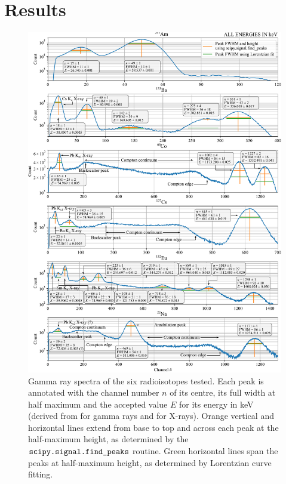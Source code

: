 \documentclass[twocol]{ametsocV6.1}
\begin{document}
\section{Results} \label{sec:results}
\begin{figure}[p]
	\vspace{-0.8cm}
	\centerline{\includegraphics[width=\textwidth]{../figures/all_spectra_annotated.pdf}}
	\cprotect\caption{%
		Gamma ray spectra of the six radioisotopes tested.
		Each peak is annotated with the channel number $n$ of its centre,
		its full width at half maximum and the accepted value $E$ for its
		energy in keV (derived from \cite{heath} for gamma rays and
		\cite{shirley_1978} for X-rays).
		Orange vertical and horizontal lines extend from base to top and
		across each peak at the half-maximum height, as determined by the
		$\verb|scipy.signal.find_peaks|$ routine. Green horizontal lines
		span the peaks at half-maximum height, as determined by Lorentzian
		curve fitting.
	} 
	\label{fig:spectra}
\end{figure}
\end{document}
